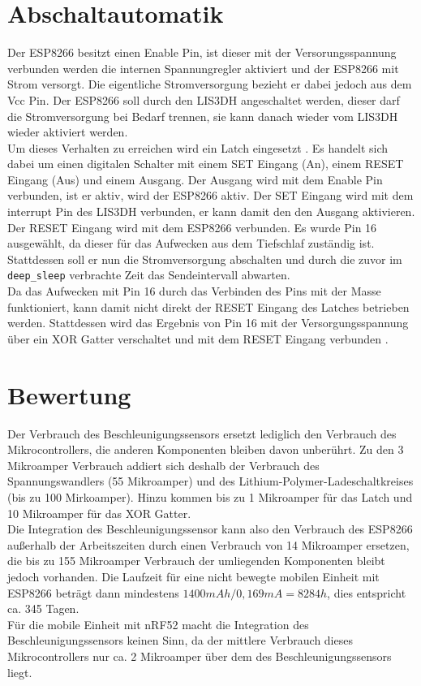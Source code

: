 \section{Abschaltautomatik}
Der ESP8266 besitzt einen Enable Pin, ist dieser mit der Versorungsspannung verbunden werden die internen Spannungregler aktiviert und der ESP8266 mit Strom versorgt.
Die eigentliche Stromversorgung bezieht er dabei jedoch aus dem Vcc Pin.
Der ESP8266 soll durch den LIS3DH angeschaltet werden, dieser darf die Stromversorgung bei Bedarf trennen, sie kann danach wieder vom LIS3DH wieder aktiviert werden. \\
Um dieses Verhalten zu erreichen wird ein Latch eingesetzt \cite{texas2003latch}.
Es handelt sich dabei um einen digitalen Schalter mit einem SET Eingang (An), einem RESET Eingang (Aus) und einem Ausgang.
Der Ausgang wird mit dem Enable Pin verbunden, ist er aktiv, wird der ESP8266 aktiv.
Der SET Eingang wird mit dem interrupt Pin des LIS3DH verbunden, er kann damit den den Ausgang aktivieren.
Der RESET Eingang wird mit dem ESP8266 verbunden. 
Es wurde Pin 16 ausgewählt, da dieser für das Aufwecken aus dem Tiefschlaf zuständig ist. 
Stattdessen soll er nun die Stromversorgung abschalten und durch die zuvor im \texttt{deep\_sleep} verbrachte Zeit das Sendeintervall abwarten.\\
Da das Aufwecken mit Pin 16 durch das Verbinden des Pins mit der Masse funktioniert, kann damit nicht direkt der RESET Eingang des Latches betrieben werden.
Stattdessen wird das Ergebnis von Pin 16 mit der Versorgungsspannung über ein XOR Gatter verschaltet und mit dem RESET Eingang verbunden \cite{texas2014xor}.

\section{Bewertung}
Der Verbrauch des Beschleunigungssensors ersetzt lediglich den Verbrauch des Mikrocontrollers, die anderen Komponenten bleiben davon unberührt.
Zu den 3 Mikroamper Verbrauch addiert sich deshalb der Verbrauch des Spannungswandlers (55 Mikroamper) und des Lithium-Polymer-Ladeschaltkreises (bis zu 100 Mirkoamper).
Hinzu kommen bis zu 1 Mikroamper für das Latch und 10 Mikroamper für das XOR Gatter.\\
Die Integration des Beschleunigungssensor kann also den Verbrauch des ESP8266 außerhalb der Arbeitszeiten durch einen Verbrauch von 14 Mikroamper ersetzen, die bis zu 155 Mikroamper Verbrauch der umliegenden Komponenten bleibt jedoch vorhanden.
Die Laufzeit für eine nicht bewegte mobilen Einheit mit ESP8266 beträgt dann mindestens $1400mAh / 0,169mA = 8284h$, dies entspricht ca. 345 Tagen.\\
Für die mobile Einheit mit nRF52 macht die Integration des Beschleunigungssensors keinen Sinn, da der mittlere Verbrauch dieses Mikrocontrollers nur ca. 2 Mikroamper über dem des Beschleunigungssensors liegt.

